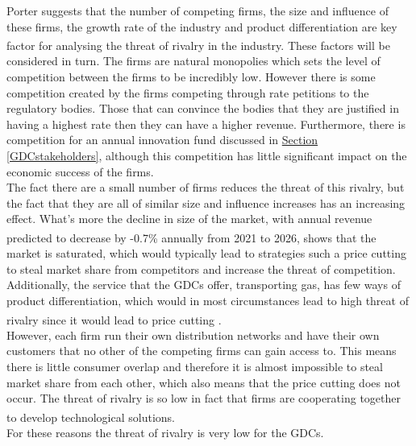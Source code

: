 \documentclass[11pt]{article}		%
\newcommand{\supercite}[1]{\textsuperscript{\cite{#1}}}		%
\newcommand{\sectref}[1]{\hyperref[#1]{Section \ref*{#1}}}     %
\begin{document}
                Porter suggests that the number of competing firms, the size and influence of these firms, the growth rate of the industry and product differentiation are key factor for analysing the threat of rivalry in the industry.\supercite{Barney} These factors will be considered in turn.
                The firms are natural monopolies which sets the level of competition between the firms to be incredibly low. However
                there is some competition created by the firms competing through rate petitions to the regulatory bodies. Those that can convince the bodies that they are justified in having a highest rate then they can have a higher revenue. Furthermore, there is competition for an annual innovation fund discussed in \sectref{GDCstakeholders}, although this competition has little significant impact on the economic success of the firms.
                \\ 
                \hspace*{3ex}The fact there are a small number of firms reduces the threat of this rivalry, but the fact that they are all of similar size and influence increases has an increasing effect. What's more the decline in size of the market, with annual revenue predicted to decrease by -0.7\% annually from 2021 to 2026,\supercite{Gas_Distribution_Industry} shows that the market is saturated, which would typically lead to strategies such a price cutting to steal market share from competitors and increase the threat of competition.
                 Additionally, the service that the GDCs offer, transporting gas, has few ways of product differentiation, which would in most circumstances lead to high threat of rivalry since it would lead to price cutting .\supercite{Gas_Distribution_Industry}
                 \\
                 \hspace*{3ex}However, each firm run their own distribution networks and have their own customers that no other of the competing firms can gain access to. This means there is little consumer overlap and therefore it is almost impossible to steal market share from each other, which also means that the price cutting does not occur. The threat of rivalry is so low in fact that firms are cooperating together to develop technological solutions.\supercite{SGN-GD2} 
                \\
                \hspace*{3ex}For these reasons the threat of rivalry is very low for the GDCs.
                
\end{document}
